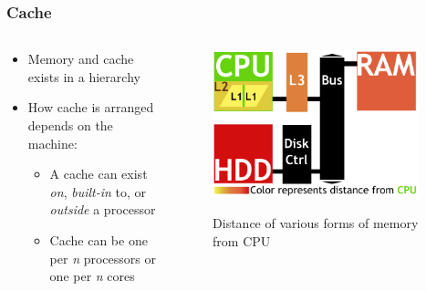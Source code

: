 \documentclass{beamer}
\begin{document}
\begin{frame}
\frametitle{Cache}

\begin{columns}
\begin{column}{0.5\textwidth}
\begin{itemize}
	\item Memory and cache exists in a hierarchy %
	\item How cache is arranged depends on the machine:
	\begin{itemize}
		\item A cache can exist \emph{on}, \emph{built-in} to, or \emph{outside} a processor
		\item Cache can be one per \emph{n} processors or one per \emph{n} cores
	\end{itemize}
\end{itemize}

\end{column}
\begin{column}{0.5\textwidth}
		\begin{figure}
		\includegraphics[width=0.95\textwidth]{Illustrations/CacheAbstract}
		\label{fig:domains}
		\caption{Distance of various forms of memory from CPU}
		\end{figure}
	\end{column}
\end{columns}
\end{frame}
\end{document}
